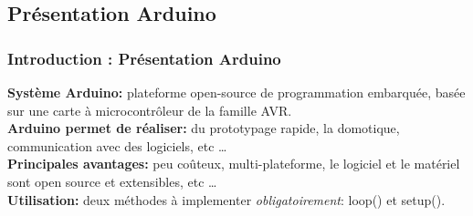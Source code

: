 \documentclass{beamer}
\begin{document}
\subsection{Présentation Arduino}
\begin{frame}
\frametitle{Introduction : Présentation Arduino}
\textbf{Système Arduino: } plateforme open-source de programmation embarquée, basée sur une carte
à microcontrôleur de la famille AVR. \\
\vspace{0.5cm}
\textbf{Arduino permet de réaliser: } du prototypage rapide, la domotique, communication avec des logiciels, etc \ldots \\
\vspace{0.5cm}
\textbf{Principales avantages: } peu coûteux, multi-plateforme, le logiciel et le matériel sont open source et extensibles, etc \ldots \\
\vspace{0.5cm}
\textbf{Utilisation: } deux méthodes à implementer \textit{obligatoirement}: loop() et setup().
\end{frame}
\end{document}
